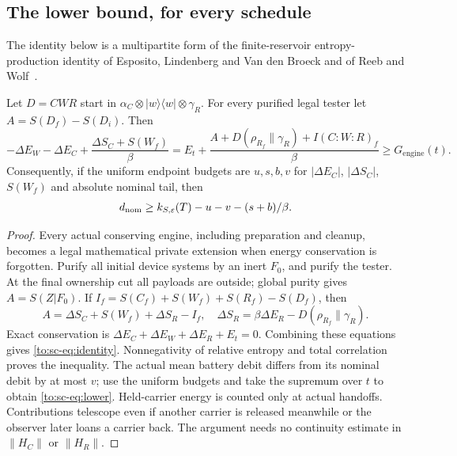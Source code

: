 \subsection{The lower bound, for every schedule}
The identity below is a multipartite form of the finite-reservoir entropy-production identity of Esposito, Lindenberg and Van den Broeck and of Reeb and Wolf~\cite{EspositoLindenbergVandenBroeck10,ReebWolf14}.
\begin{lemma}\label{to:sc-lem:account}
Let $D=CWR$ start in $\alpha_C\otimes|w\rangle\langle w|\otimes\gamma_R$. For every purified legal tester let $A=S(D_f)-S(D_i)$. Then
\begin{equation}\label{to:sc-eq:identity}
-\Delta E_W-\Delta E_C+\frac{\Delta S_C+S(W_f)}{\beta}
=E_t+\frac{A+D(\rho_{R_f}\|\gamma_R)+I(C{:}W{:}R)_f}{\beta}
\ge G_{\mathrm{engine}}(t).
\end{equation}
Consequently, if the uniform endpoint budgets are $u,s,b,v$ for $|\Delta E_C|$, $|\Delta S_C|$, $S(W_f)$ and absolute nominal tail, then
\begin{equation}\label{to:sc-eq:lower}
d_{\mathrm{nom}}\ge k_{S,\varepsilon}(T)-u-v-(s+b)/\beta.
\end{equation}
\end{lemma}
\begin{proof}
Every actual conserving engine, including preparation and cleanup, becomes a legal mathematical private extension when energy conservation is forgotten. Purify all initial device systems by an inert $F_0$, and purify the tester. At the final ownership cut all payloads are outside; global purity gives $A=S(Z|F_0)$. If $I_f=S(C_f)+S(W_f)+S(R_f)-S(D_f)$, then
\[
A=\Delta S_C+S(W_f)+\Delta S_R-I_f,
\quad
\Delta S_R=\beta\Delta E_R-D(\rho_{R_f}\|\gamma_R).
\]
Exact conservation is $\Delta E_C+\Delta E_W+\Delta E_R+E_t=0$. Combining these equations gives \eqref{to:sc-eq:identity}. Nonnegativity of relative entropy and total correlation proves the inequality. The actual mean battery debit differs from its nominal debit by at most $v$; use the uniform budgets and take the supremum over $t$ to obtain \eqref{to:sc-eq:lower}. Held-carrier energy is counted only at actual handoffs. Contributions telescope even if another carrier is released meanwhile or the observer later loans a carrier back. The argument needs no continuity estimate in $\|H_C\|$ or $\|H_R\|$.
\end{proof}

